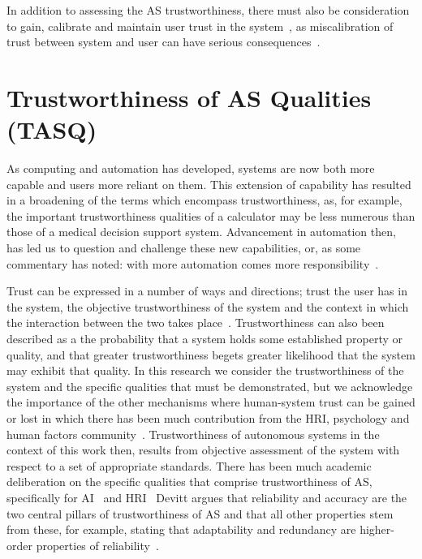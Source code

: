 In addition to assessing the AS trustworthiness, there must also be consideration to gain, calibrate and maintain user trust in the system~\cite{kok2020trust, Chiou2021}, as miscalibration of trust between system and user can have serious consequences~\cite{kok2020trust}. 





\section{Trustworthiness of AS Qualities (TASQ)}

As computing and automation has developed, systems are now both more capable and users more reliant on them. This extension of capability has resulted in a broadening of the terms which encompass trustworthiness, as, for example, the important trustworthiness qualities of a calculator may be less numerous than those of a medical decision support system. Advancement in automation then, has led us to question and challenge these new capabilities, or, as some commentary has noted: with more automation comes more responsibility~\cite{Yazdanpanah2021}. 

Trust can be expressed in a number of ways and directions; trust the user has in the system, the objective trustworthiness of the system and the context in which the interaction between the two takes place~\cite{Hancock2021}. 
%
Trustworthiness can also been described as a the probability that a system holds some established property or quality, and that greater trustworthiness begets greater likelihood that the system may exhibit that quality. 
%
In this research we consider the trustworthiness of the system and the specific qualities that must be demonstrated, but we acknowledge the importance of the other mechanisms where human-system trust can be gained or lost in which there has been much contribution from the HRI, psychology and human factors community~\cite{Floridi2019,Lee2004,kok2020trust,Chiou2021,Kohn2021,kraus2022trustworthy}. 
%
Trustworthiness of autonomous systems in the context of this work then, results from objective assessment of the system with respect to a set of appropriate standards. 
%
There has been much academic deliberation on the specific qualities that comprise trustworthiness of AS, specifically for AI~\cite{Thiebes2021,Wing2021} and HRI~\cite{kraus2022trustworthy,atkinson2012trust}
%
Devitt argues that reliability and accuracy are the two central pillars of trustworthiness of AS and that all other properties stem from these, for example, stating that adaptability and redundancy are higher-order properties of reliability~\cite{devitt2018trustworthiness}. 

